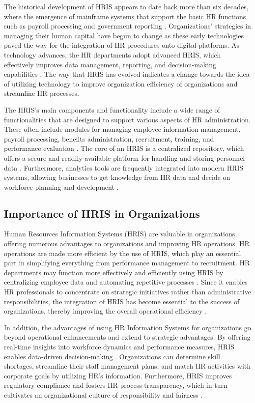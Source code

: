         The historical development of HRIS appears to date back more than six decades, where the emergence of mainframe systems that support the basic HR functions such as payroll processing and government reporting \cite{srr12023}. Organizations’ strategies in managing their human capital have begun to change as these early technologies paved the way for the integration of HR procedures onto digital platforms. As technology advances, the HR departments adopt advanced HRIS, which effectively improves data management, reporting,  and decision-making capabilities  \cite{ml12019}. The way that HRIS has evolved indicates a change towards the idea of utilizing technology to improve organization efficiency of organizations and streamline HR processes.
        
        The HRIS’s main components and functionality include a wide range of functionalities that are designed to support various aspects of HR administration. These often include modules for managing employee information management, payroll processing, benefits administration, recruitment, training, and performance evaluation \cite{ep12023}. The core of an HRIS is a centralized repository, which offers a secure and readily available platform for handling and storing personnel data \cite{h12020}. Furthermore, analytics tools are frequently integrated into modern HRIS systems, allowing businesses to get knowledge from HR data and decide on workforce planning and development \cite{aa12021}.
        
    \subsection{Importance of HRIS in Organizations}
    
        Human Resources Information Systems (HRIS) are valuable in organizations, offering numerous advantages to organizations and improving HR operations. HR operations are made more efficient by the use of HRIS, which play an essential part in simplifying everything from performance management to recruitment. HR departments may function more effectively and efficiently using HRIS by centralizing employee data and automating repetitive processes \cite{s12024}. Since it enables HR professionals to concentrate on strategic initiatives rather than administrative responsibilities, the integration of HRIS has become essential to the success of organizations, thereby improving the overall operational efficiency \cite{ta12023}. 

        In addition, the advantages of using HR Information Systems for organizations go beyond operational enhancements and extend to strategic advantages. By offering real-time insights into workforce dynamics and performance measures, HRIS enables data-driven decision-making \cite{hae12021}. Organizations can determine skill shortages, streamline their staff management plans, and match HR activities with corporate goals by utilizing HR's information. Furthermore, HRIS improves regulatory compliance and fosters HR process transparency, which in turn cultivates an organizational culture of responsibility and fairness \cite{pfsa12023}.
        
